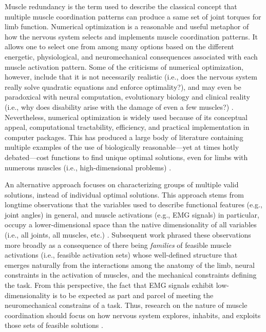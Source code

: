 Muscle redundancy is the term used to describe the classical concept that multiple muscle coordination patterns can   produce a same set of joint torques for limb function.
Numerical optimization is a reasonable and useful metaphor of how the nervous system selects and implements muscle coordination patterns. It allows one to select one from among   many  options based on the  different energetic, physiological, and neuromechanical consequences associated with each muscle activation pattern\cite{Chao1978Graphical,Prilutsky2000Muscle,scott2004optimal,todorov2002optimal,crowninshield1981physiologically,higginson2005simulated}. 
Some of the criticisms of numerical optimization, however,  include that it is not necessarily  realistic (i.e., does the nervous system really solve quadratic equations and enforce optimality?), and may even be paradoxical with neural computation, evolutionary biology and clinical reality (i.e., why does disability arise with the damage of even a few muscles?) \cite{valero2015fundamentals,deRugy2012habitual,loeb2000overcomplete,loeb2012optimal}. Nevertheless,  numerical optimization is widely used because of its conceptual appeal,  computational tractability,  efficiency, and practical implementation in computer packages. This has produced a large body of literature containing multiple examples of the use of biologically reasonable---yet at times hotly debated---cost functions  to find unique optimal solutions, even for  limbs with numerous muscles (i.e., high-dimensional problems) \cite{valero2009computational}.

An alternative  approach  focuses on characterizing groups of multiple valid solutions, instead of individual optimal solutions. This approach stems from longtime observations that the variables used to describe functional features (e.g., joint angles) in general, and muscle activations (e.g., EMG signals) in particular, occupy  a lower-dimensional  space than the native dimensionality of all variables (i.e., all joints, all muscles, etc.)  \cite{scholz1999uncontrolled,bizzi2013neural,davella2005shared,Clewley2008Estimating}.   Subsequent work phrased these observations more broadly as a consequence of there being  \emph{families} of feasible muscle activations  (i.e., feasible activation sets) whose well-defined structure that emerges naturally from the interactions among the anatomy of the limb, neural constraints in the activation of muscles, and the mechanical  constraints defining the task\cite{kutch2011muscle,sohn2013cat_bounding_box,Valero-Cuevas1998Large,Valero-Cuevas2015high-dimensional,Kuo1993Human,valero-cuevas2015fundamentals,schieber2004hand}. From this perspective, the fact that EMG signals  exhibit low-dimensionality is to be expected as  part and parcel of meeting the neuromechanical constrains of a task. Thus, research on the nature of muscle coordination should  focus on how nervous system  explores, inhabits, and exploits those sets of feasible solutions \cite{kutch2012challenges,steele2013number,bizzi2013neural,tresch2009case,dingwell2010walkingvariability,racz2013spatiotemporal,steele2015consequences}.

